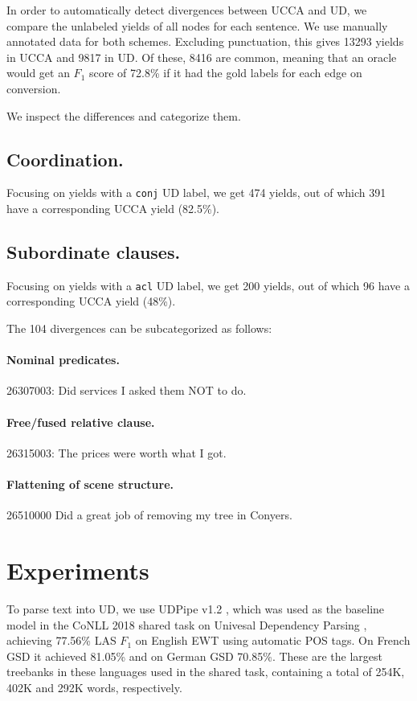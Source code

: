 \documentclass[11pt,a4paper]{article}
\begin{document}
In order to automatically detect divergences between UCCA and UD,
we compare the unlabeled yields of all nodes for each sentence.
We use manually annotated data for both schemes.
Excluding punctuation, this gives 13293 yields in UCCA and
9817 in UD.
Of these, 8416 are common, meaning that an oracle would get an $F_1$ score
of 72.8\% if it had the gold labels for each edge on conversion.

We inspect the differences and categorize them.

\subsection{Coordination.}
Focusing on yields with a \verb|conj| UD label,
we get 474 yields, out of which 391 have a corresponding UCCA yield (82.5\%).

\subsection{Subordinate clauses.}
Focusing on yields with a \verb|acl| UD label,
we get 200 yields, out of which 96 have a corresponding UCCA yield (48\%).

The 104 divergences can be subcategorized as follows:

\paragraph{Nominal predicates.}

26307003:
Did services I asked them NOT to do.

\paragraph{Free/fused relative clause.}

26315003:
The prices were worth what I got.

\paragraph{Flattening of scene structure.}

26510000
Did a great job of removing my tree in Conyers.


\section{Experiments}\label{sec:experiments}

To parse text into UD, we use UDPipe v1.2 \cite{udpipe,udpipe:2017},
which was used as the baseline model in the CoNLL 2018 shared task on
Univesal Dependency Parsing \cite{zeman-EtAl:2018:K18-2},
achieving 77.56\% LAS $F_1$ on English EWT using automatic POS tags.
On French GSD it achieved 81.05\% and on German GSD 70.85\%.
These are the largest treebanks in these languages
used in the shared task, containing a total of 254K, 402K and 292K
words, respectively.
\end{document}
